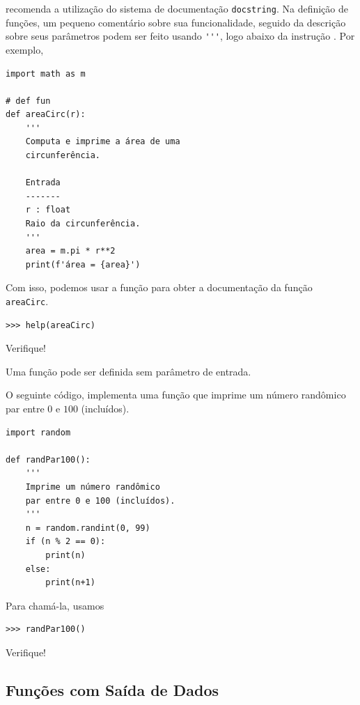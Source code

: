 \begin{obs}
  {\python} recomenda a utilização do sistema de documentação \lstinline+docstring+. Na definição de funções, um pequeno comentário sobre sua funcionalidade, seguido da descrição sobre seus parâmetros podem ser feito usando \lstinline+'''+, logo abaixo da instrução {\PYTHONdef}. Por exemplo,

\begin{lstlisting}
import math as m

# def fun
def areaCirc(r):
    '''
    Computa e imprime a área de uma
    circunferência.

    Entrada
    -------
    r : float
    Raio da circunferência.
    '''
    area = m.pi * r**2
    print(f'área = {area}')
\end{lstlisting}

Com isso, podemos usar a função {\PYTHONhelp} para obter a documentação da função \lstinline+areaCirc+.

\begin{lstlisting}
>>> help(areaCirc)
\end{lstlisting}

Verifique!
\end{obs}

Uma função pode ser definida sem parâmetro de entrada.

\begin{ex}
  O seguinte código, implementa uma função que imprime um número randômico par entre $0$ e $100$ (incluídos).

\begin{lstlisting}
import random

def randPar100():
    '''
    Imprime um número randômico
    par entre 0 e 100 (incluídos).
    '''
    n = random.randint(0, 99)
    if (n % 2 == 0):
        print(n)
    else:
        print(n+1)
\end{lstlisting}

Para chamá-la, usamos

\begin{lstlisting}
>>> randPar100()
\end{lstlisting}

Verifique!
\end{ex}

\subsection{Funções com Saída de Dados}

